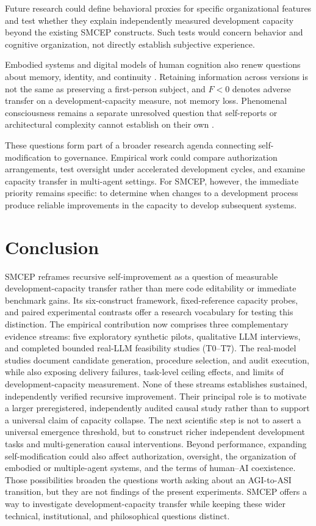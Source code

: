 \documentclass[11pt,a4paper]{article}
\begin{document}
Future research could define behavioral proxies for specific organizational features and test whether they explain independently measured development capacity beyond the existing SMCEP constructs. Such tests would concern behavior and cognitive organization, not directly establish subjective experience.

Embodied systems and digital models of human cognition also renew questions about memory, identity, and continuity \cite{sandberg2008,parfit1984}. Retaining information across versions is not the same as preserving a first-person subject, and \(F<0\) denotes adverse transfer on a development-capacity measure, not memory loss. Phenomenal consciousness remains a separate unresolved question that self-reports or architectural complexity cannot establish on their own \cite{butlin2023,chalmers1995}.

These questions form part of a broader research agenda connecting self-modification to governance. Empirical work could compare authorization arrangements, test oversight under accelerated development cycles, and examine capacity transfer in multi-agent settings. For SMCEP, however, the immediate priority remains specific: to determine when changes to a development process produce reliable improvements in the capacity to develop subsequent systems.

\section{Conclusion}
SMCEP reframes recursive self-improvement as a question of measurable development-capacity transfer rather than mere code editability or immediate benchmark gains. Its six-construct framework, fixed-reference capacity probes, and paired experimental contrasts offer a research vocabulary for testing this distinction. The empirical contribution now comprises three complementary evidence streams: five exploratory synthetic pilots, qualitative LLM interviews, and completed bounded real-LLM feasibility studies (T0--T7). The real-model studies document candidate generation, procedure selection, and audit execution, while also exposing delivery failures, task-level ceiling effects, and limits of development-capacity measurement. None of these streams establishes sustained, independently verified recursive improvement. Their principal role is to motivate a larger preregistered, independently audited causal study rather than to support a universal claim of capacity collapse. The next scientific step is not to assert a universal emergence threshold, but to construct richer independent development tasks and multi-generation causal interventions. Beyond performance, expanding self-modification could also affect authorization, oversight, the organization of embodied or multiple-agent systems, and the terms of human--AI coexistence. Those possibilities broaden the questions worth asking about an AGI-to-ASI transition, but they are not findings of the present experiments. SMCEP offers a way to investigate development-capacity transfer while keeping these wider technical, institutional, and philosophical questions distinct.
\end{document}
